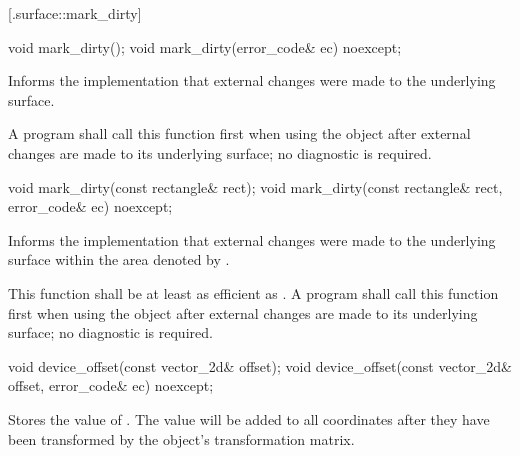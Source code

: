  [\iotwod.surface::mark_dirty] {}

\begin{itemdecl}
void mark_dirty();
void mark_dirty(error_code& ec) noexcept;
\end{itemdecl}
\begin{itemdescr}
	\pnum
	\effects
	Informs the implementation that external changes were made to the underlying surface.
	
	\pnum
	\remarks
	A program shall call this function first when using the  object after external changes are made to its underlying surface; no diagnostic is required.
\end{itemdescr}

\begin{itemdecl}
void mark_dirty(const rectangle& rect);
void mark_dirty(const rectangle& rect, error_code& ec) noexcept;
\end{itemdecl}
\begin{itemdescr}
	\pnum
	\effects
	Informs the implementation that external changes were made to the underlying surface within the area denoted by .
	
	\pnum
	\remarks
	This function shall be at least as efficient as . A program shall call this function first when using the  object after external changes are made to its underlying surface; no diagnostic is required.
\end{itemdescr}

\begin{itemdecl}
void device_offset(const vector_2d& offset);
void device_offset(const vector_2d& offset, error_code& ec) noexcept;
\end{itemdecl}
\begin{itemdescr}
	\pnum
	\effects
	Stores the value of . The value will be added to all coordinates after they have been transformed by the  object's transformation matrix.
\end{itemdescr}


